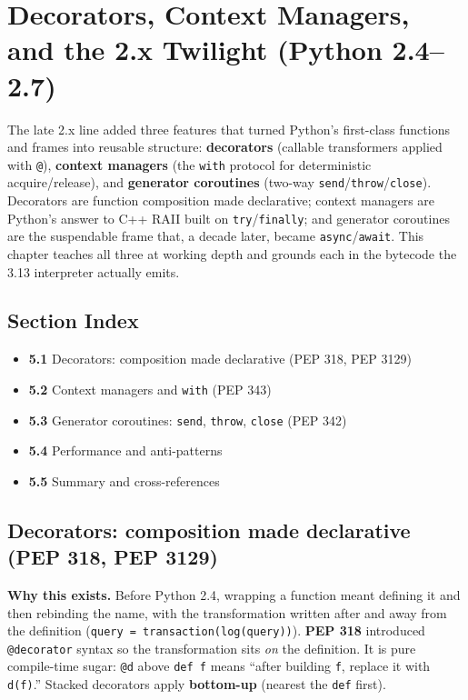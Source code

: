 \chapter{Decorators, Context Managers, and the 2.x Twilight (Python 2.4--2.7)}

The late 2.x line added three features that turned Python's first-class functions and frames
into reusable structure: \textbf{decorators} (callable transformers applied with \texttt{@}),
\textbf{context managers} (the \texttt{with} protocol for deterministic acquire/release), and
\textbf{generator coroutines} (two-way \texttt{send}/\texttt{throw}/\texttt{close}). Decorators
are function composition made declarative; context managers are Python's answer to C++ RAII
built on \texttt{try}/\texttt{finally}; and generator coroutines are the suspendable frame
that, a decade later, became \texttt{async}/\texttt{await}. This chapter teaches all three at
working depth and grounds each in the bytecode the 3.13 interpreter actually emits.

\section*{Section Index}
\begin{itemize}
  \item \textbf{5.1} Decorators: composition made declarative (PEP 318, PEP 3129)
  \item \textbf{5.2} Context managers and \texttt{with} (PEP 343)
  \item \textbf{5.3} Generator coroutines: \texttt{send}, \texttt{throw}, \texttt{close} (PEP 342)
  \item \textbf{5.4} Performance and anti-patterns
  \item \textbf{5.5} Summary and cross-references
\end{itemize}

\section{Decorators: composition made declarative (PEP 318, PEP 3129)}

\textbf{Why this exists.} Before Python 2.4, wrapping a function meant defining it and then
rebinding the name, with the transformation written after and away from the definition
(\texttt{query = transaction(log(query))}). \textbf{PEP 318} introduced \texttt{@decorator}
syntax so the transformation sits \emph{on} the definition. It is pure compile-time sugar:
\texttt{@d} above \texttt{def f} means ``after building \texttt{f}, replace it with
\texttt{d(f)}.'' Stacked decorators apply \textbf{bottom-up} (nearest the \texttt{def} first).

